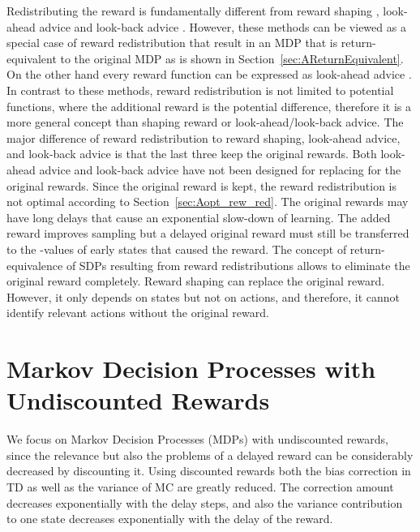 \documentclass{article}
\begin{document}
\begin{appendices}
Redistributing the reward is fundamentally different from
reward shaping \cite{Ng:99,Wiewiora:03}, look-ahead advice and
look-back advice \cite{Wiewiora:03icml}. 
However, these methods can be viewed as a special case of 
reward redistribution that result in an MDP that is return-equivalent 
to the original MDP as is shown in Section~\ref{sec:AReturnEquivalent}. 
On the other hand every reward function can be expressed as
look-ahead advice \cite{Harutyunyan:15}.
In contrast to these methods, 
reward redistribution is not limited to potential functions, where
the additional reward is the potential difference, therefore it is a more
general concept than shaping reward or look-ahead/look-back advice.
The major difference of reward redistribution to reward shaping,
look-ahead advice, and look-back advice 
is that the last three keep the original rewards. 
Both look-ahead advice and look-back advice 
have not been designed for replacing for the original rewards.
Since the original reward is kept, the reward redistribution is
not optimal according to Section~\ref{sec:Aopt_rew_red}.
The original rewards 
may have long delays that cause an exponential slow-down of learning. 
The added reward improves sampling but a delayed original reward must
still be transferred to the -values of early states that caused the reward.
The concept of return-equivalence of SDPs resulting from 
reward redistributions allows to 
eliminate the original reward completely.
Reward shaping can replace the original reward.
However, it only depends on states but not on actions, 
and therefore, it cannot identify
relevant actions without the original reward.





\clearpage
\pagebreak


\section{Markov Decision Processes with Undiscounted Rewards}

We focus on Markov Decision Processes (MDPs)
with undiscounted rewards, since
the relevance but also the problems
of a delayed reward can be considerably decreased by discounting it.
Using discounted rewards both the bias correction in TD as well as the variance 
of MC are greatly reduced. The correction amount decreases exponentially with 
the delay steps, and also the variance contribution to one state 
decreases exponentially 
with the delay of the reward.


\end{appendices}
\end{document}
